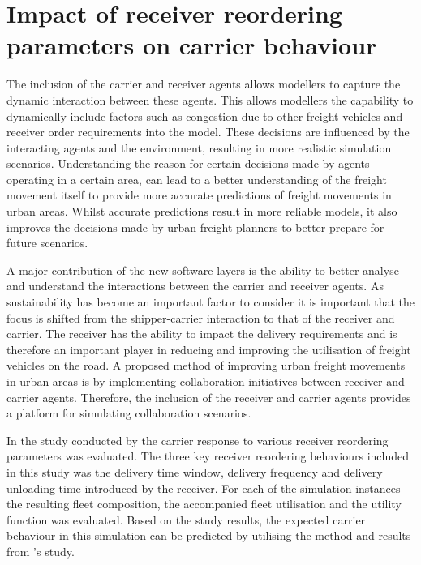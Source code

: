 \section{Impact of receiver reordering parameters on carrier behaviour}
The inclusion of the carrier and receiver agents allows modellers to capture the dynamic interaction between these agents. This allows modellers the capability to dynamically include factors such as congestion due to other freight vehicles and receiver order requirements into the model. These decisions are influenced by the interacting agents and the environment, resulting in more realistic simulation scenarios. Understanding the reason for certain decisions made by agents operating in a certain area, can lead to a better understanding of the freight movement itself to provide more accurate predictions of freight movements in urban areas. Whilst accurate predictions result in more reliable models, it also improves the decisions made by urban freight planners to better prepare for future scenarios.\par

A major contribution of the new software layers is the ability to better analyse and understand the interactions between the carrier and receiver agents. As sustainability has become an important factor to consider it is important that the focus is shifted from the shipper-carrier interaction to that of the receiver and carrier. The receiver has the ability to impact the delivery requirements and is therefore an important player in reducing and improving the utilisation of freight vehicles on the road. A proposed method of improving urban freight movements in urban areas is by implementing collaboration initiatives between receiver and carrier agents. Therefore, the inclusion of the receiver and carrier agents provides a platform for simulating collaboration scenarios.

 In the study conducted by \citet{bean2019behavioural} the carrier response to various receiver reordering parameters was evaluated. The three key receiver reordering behaviours included in this study was the delivery time window, delivery frequency and delivery unloading time introduced by the receiver. For each of the simulation instances the resulting fleet composition, the accompanied fleet utilisation and the utility function was evaluated. Based on the study results, the expected carrier behaviour in this simulation can be predicted by utilising the method and results from \citet{bean2019behavioural}'s study.

